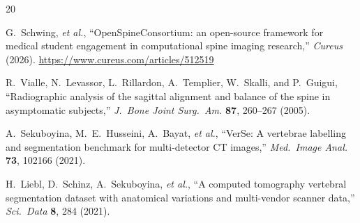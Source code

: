 \documentclass[aapm,mph,amsmath,amssymb,reprint,linenumbers]{revtex4-2}
\begin{document}
\begin{thebibliography}{20}
\sloppy

%
%
%

 G.~Schwing, \emph{et al.}, ``OpenSpineConsortium: an open-source
framework for medical student engagement in computational spine imaging research,''
\emph{Cureus} (2026).
\url{https://www.cureus.com/articles/512519}

 R.~Vialle, N.~Levassor, L.~Rillardon, A.~Templier, W.~Skalli, and
P.~Guigui, ``Radiographic analysis of the sagittal alignment and balance of the spine in
asymptomatic subjects,'' \emph{J.~Bone Joint Surg.~Am.} \textbf{87}, 260--267 (2005).

 A.~Sekuboyina, M.~E.~Husseini, A.~Bayat, \emph{et al.}, ``VerSe: A
vertebrae labelling and segmentation benchmark for multi-detector CT images,''
\emph{Med.~Image Anal.} \textbf{73}, 102166 (2021).

 H.~Liebl, D.~Schinz, A.~Sekuboyina, \emph{et al.}, ``A
computed tomography vertebral segmentation dataset with anatomical variations and
multi-vendor scanner data,'' \emph{Sci.~Data} \textbf{8}, 284 (2021).


\end{thebibliography}
\end{document}
